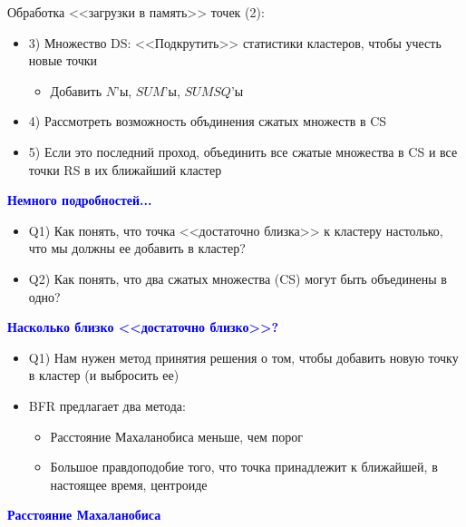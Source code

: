 \documentclass[landscape]{slides}
\begin{document}
\begin{normalsize}
\begin{slide}
Обработка <<загрузки в память>> точек (2):
\begin{itemize}
\item 3) Множество DS: <<Подкрутить>> статистики кластеров, чтобы учесть новые точки
  \begin{itemize}
  \item Добавить $N$'ы, $SUM$'ы, $SUMSQ$'ы
  \end{itemize}
\item 4) Рассмотреть возможность объдинения сжатых множеств в CS
\item 5) Если это последний проход, объединить все сжатые множества в CS и все точки RS в их ближайший кластер
\end{itemize}
\end{slide}




\begin{slide}
\textbf{\textcolor{blue}{Немного подробностей...}}

\begin{itemize}
\item Q1) Как понять, что точка <<достаточно близка>> к кластеру настолько, что мы должны ее добавить в кластер?
\item Q2) Как понять, что два сжатых множества (CS) могут быть объединены в одно?
\end{itemize}
\end{slide}



\begin{slide}
\textbf{\textcolor{blue}{Насколько близко <<достаточно близко>>?}}

\begin{itemize}
\item Q1) Нам нужен метод принятия решения о том, чтобы добавить новую точку в кластер (и выбросить ее)
\item BFR предлагает два метода:
  \begin{itemize}
  \item Расстояние Махаланобиса меньше, чем порог
  \item  Большое правдоподобие того, что точка принадлежит к ближайшей, в настоящее время, центроиде
  \end{itemize}
\end{itemize}
\end{slide}


\begin{slide}
\textbf{\textcolor{blue}{Расстояние Махаланобиса}}


\end{slide}
\end{normalsize}
\end{document}
